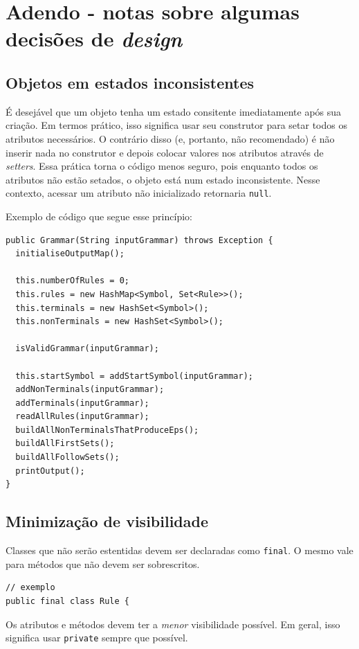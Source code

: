 \documentclass[11pt]{article}
\begin{document}
\section{Adendo - notas sobre algumas decisões de \emph{design}}
\label{sec:orgheadline3}
\subsection{Objetos em estados inconsistentes}
\label{sec:orgheadline19}
É desejável que um objeto tenha um estado consitente imediatamente após sua
criação. Em termos prático, isso significa usar seu construtor para setar todos
os atributos necessários. O contrário disso (e, portanto, não recomendado) é não
inserir nada no construtor e depois colocar valores nos atributos através de \emph{setters}. 
Essa prática torna o código menos seguro, pois enquanto todos os atributos não
estão setados, o objeto está num estado inconsistente. Nesse contexto, acessar um
atributo não inicializado retornaria \texttt{null}.

Exemplo de código que segue esse princípio:

\begin{verbatim}
public Grammar(String inputGrammar) throws Exception {
  initialiseOutputMap();

  this.numberOfRules = 0;
  this.rules = new HashMap<Symbol, Set<Rule>>();
  this.terminals = new HashSet<Symbol>();
  this.nonTerminals = new HashSet<Symbol>();

  isValidGrammar(inputGrammar);

  this.startSymbol = addStartSymbol(inputGrammar);
  addNonTerminals(inputGrammar);
  addTerminals(inputGrammar);
  readAllRules(inputGrammar);
  buildAllNonTerminalsThatProduceEps();
  buildAllFirstSets();
  buildAllFollowSets();
  printOutput();
}
\end{verbatim}

\subsection{Minimização de visibilidade}
\label{sec:orgheadline20}
Classes que não serão estentidas devem ser declaradas como \texttt{final}. O mesmo vale
para métodos que não devem ser sobrescritos.

\begin{verbatim}
// exemplo
public final class Rule {
\end{verbatim}

Os atributos e métodos devem ter a \emph{menor} visibilidade possível. Em
geral, isso significa usar \texttt{private} sempre que possível.
\end{document}
